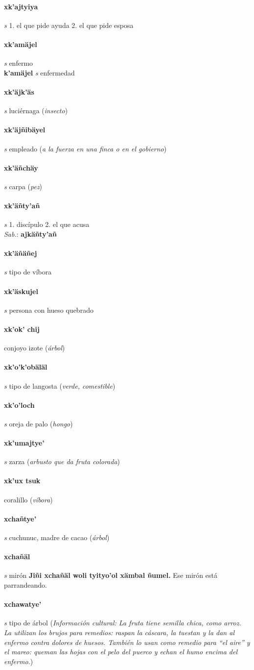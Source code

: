 \documentclass{scrbook}
\newcommand{\entry}[1]{\paragraph{#1}}
\newcommand{\onedefinition}[1]{#1.}
\newcommand{\partofspeech}[1]{\textit{#1}}
\newcommand{\spanishtranslation}[1]{#1}
\newcommand{\clarification}[1]{(\textit{#1})}
\newcommand{\cholexample}[1]{\textbf{#1}}
\newcommand{\exampletranslation}[1]{#1}
\newcommand{\dialectvariant}[1]{\\\textit{#1}:}
\newcommand{\dialectword}[1]{\textbf{#1}}
\newcommand{\culturalinformation}[1]{(\textit{#1})}
\newcommand{\secondaryentry}[1]{\\\textbf{#1}}
\newcommand{\secondpartofspeech}[1]{\textit{#1}}
\newcommand{\secondtranslation}[1]{#1}
\begin{document}
\begin{multicols}{2}
\entry{xk'ajtyiya}
\partofspeech{s}
\onedefinition{1}
\spanishtranslation{el que pide ayuda}
\onedefinition{2}
\spanishtranslation{el que pide esposa}

\entry{xk'amäjel}
\partofspeech{s}
\spanishtranslation{enfermo}
\secondaryentry{k'amäjel}
\secondpartofspeech{s}
\secondtranslation{enfermedad}

\entry{xk'äjk'äs}
\partofspeech{s}
\spanishtranslation{luciérnaga}
\clarification{insecto}

\entry{xk'äjñibäyel}
\partofspeech{s}
\spanishtranslation{empleado}
\clarification{a la fuerza en una finca o en el gobierno}

\entry{xk'äñchäy}
\partofspeech{s}
\spanishtranslation{carpa}
\clarification{pez}

\entry{xk'äñty'añ}
\partofspeech{s}
\onedefinition{1}
\spanishtranslation{discípulo}
\onedefinition{2}
\spanishtranslation{el que acusa}
\dialectvariant{Sab.}
\dialectword{ajkäñty'añ}

\entry{xk'äñäñej}
\partofspeech{s}
\spanishtranslation{tipo de víbora}

\entry{xk'äskujel}
\partofspeech{s}
\spanishtranslation{persona con hueso quebrado}

\entry{xk'ok' chij}
\spanishtranslation{conjoyo}
\spanishtranslation{izote}
\clarification{árbol}

\entry{xk'o'k'obäläl}
\partofspeech{s}
\spanishtranslation{tipo de langosta}
\clarification{verde, comestible}

\entry{xk'o'loch}
\partofspeech{s}
\spanishtranslation{oreja de palo}
\clarification{hongo}

\entry{xk'umajtye'}
\partofspeech{s}
\spanishtranslation{zarza}
\clarification{arbusto que da fruta colorada}

\entry{xk'ux tsuk}
\spanishtranslation{coralillo}
\clarification{víbora}

\entry{xchañtye'}
\partofspeech{s}
\spanishtranslation{cuchunuc, madre de cacao}
\clarification{árbol}

\entry{xchañäl}
\partofspeech{s}
\spanishtranslation{mirón}
\cholexample{Jiñi xchañäl woli tyityo'ol xämbal ñumel.}
\exampletranslation{Ese mirón está parrandeando.}

\entry{xchawatye'}
\partofspeech{s}
\spanishtranslation{tipo de árbol}
\culturalinformation{Información cultural: La fruta tiene semilla chica, como arroz. La utilizan los brujos para remedios: raspan la cáscara, la tuestan y la dan al enfermo contra dolores de huesos. También lo usan como remedio para “el aire” y el mareo: queman las hojas con el pelo del puerco y echan el humo encima del enfermo.}


\end{multicols}
\end{document}
